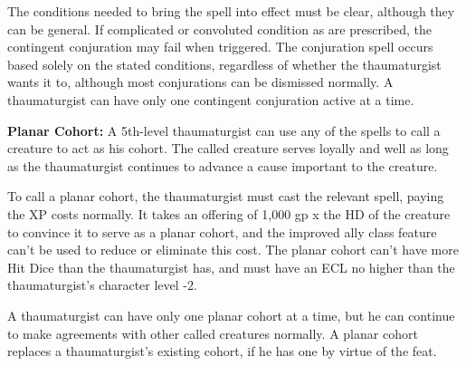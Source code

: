 The conditions needed to bring the spell into effect must be clear, although they 
can be general. If complicated or convoluted condition as are prescribed, the contingent 
conjuration may fail when triggered. The conjuration spell occurs based solely 
on the stated conditions, regardless of whether the thaumaturgist wants it to, 
although most conjurations can be dismissed normally. A thaumaturgist can have 
only one contingent conjuration active at a time.

\textbf{Planar Cohort:} A 5th-level thaumaturgist can use any of the 
spells to call a creature to act as his cohort. The called creature serves 
loyally and well as long as the thaumaturgist continues to advance a cause important 
to the creature. 

To call a planar cohort, the thaumaturgist must cast the relevant spell, paying 
the XP costs normally. It takes an offering of 1,000 gp x the HD of the creature 
to convince it to serve as a planar cohort, and the improved ally class feature 
can't be used to reduce or eliminate this cost. The planar cohort can't have more 
Hit Dice than the thaumaturgist has, and must have an ECL no higher than the thaumaturgist's 
character level -2.

A thaumaturgist can have only one planar cohort at a time, but he can continue 
to make agreements with other called creatures normally. A planar cohort replaces 
a thaumaturgist's existing cohort, if he has one by virtue of the  feat.
